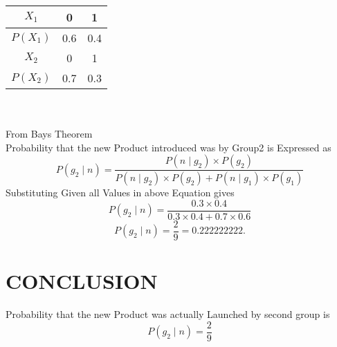 \documentclass[journal,12pt,twocolumn]{IEEEtran}
\begin{document}
 \begin{tabular}{|c|c|c|}
\hline
   $X_1$  & 0 & 1  \\
\hline
 $ P(X_1) $& 0.6 & 0.4 \\
\hline
  $X_2$ & 0 & 1 \\
\hline 
  $ P(X_2)$ & 0.7 & 0.3 \\
\hline 
\end{tabular}\\ \\
From Bays Theorem \\
Probability that the new Product introduced was by Group2 is Expressed as
\begin{equation*}
   P(g_2\mid n)=\frac{P(n\mid g_2)\times P(g_2)}{{P(n\mid g_2)\times P(g_2)}+{P(n\mid g_1)\times P(g_1)}}
\end{equation*}
Substituting Given all Values in above Equation gives
\begin{equation*}
    P(g_2\mid n)=\frac{0.3\times 0.4}{{0.3\times 0.4}+{0.7\times 0.6}}
\end{equation*}
\begin{equation*}
    P(g_2\mid n)=\frac{2}{9}=0.222222222.
\end{equation*}
\section{CONCLUSION}
Probability that the new Product was actually Launched by second group is 
\begin{equation*}
   P(g_2\mid n)=\frac{2}{9}
\end{equation*}
\end{document}
